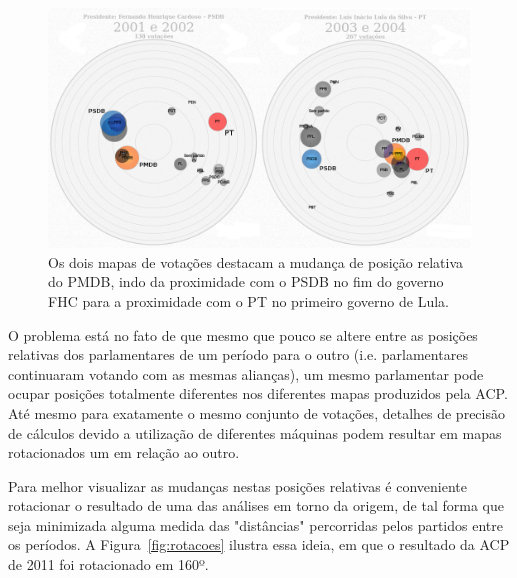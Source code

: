 \documentclass[a4paper, 12pt]{article}
\begin{document}
\begin{figure}[h]
  \centering
  \includegraphics[scale=0.37]{figs/fhc2-lula1.png}
  \caption{Os dois mapas de votações destacam a mudança de posição relativa do PMDB, indo da proximidade com o PSDB no fim do governo FHC para a proximidade com o PT no primeiro governo de Lula.}
  \label{fig:fhc2-lula1}
\end{figure}

O problema está no fato de que mesmo que pouco se altere entre as posições relativas dos parlamentares de um período para o outro (i.e. parlamentares continuaram votando com as mesmas alianças), um mesmo parlamentar pode ocupar posições totalmente diferentes nos diferentes mapas produzidos pela ACP. Até mesmo para exatamente o mesmo conjunto de votações, detalhes de precisão de cálculos devido a utilização de diferentes máquinas podem resultar em mapas rotacionados um em relação ao outro.

Para melhor visualizar as mudanças nestas posições relativas é conveniente rotacionar o resultado de uma das análises em torno da origem, de tal forma que seja minimizada alguma medida das "distâncias" percorridas pelos partidos entre os períodos. A Figura~\ref{fig:rotacoes} ilustra essa ideia, em que o resultado da
ACP de 2011 foi rotacionado em 160º. \\
\end{document}
